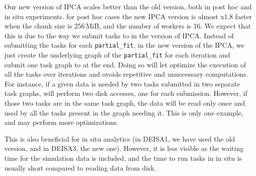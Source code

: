 Our new version of IPCA scales better than the old version, both in post hoc and in situ experiments. for post hoc cases the new IPCA version is almost x1.8 faster when the chunk size is 256\,MiB, and the number of workers is 16. We expect that this is due to the way we submit tasks to \dask in the version of IPCA.
Instead of submitting the tasks for each \texttt{partial\_fit}, in the new version of the IPCA, we just create the underlying graph of the \texttt{partial\_fit} for each iteration and submit one task graph to \dask at the end. Doing so will let \dask optimize the execution of all the tasks over iterations and ovoids repetitive and unnecessary computations. For instance, if a given data is needed by two tasks submitted in two separate task graphs, \dask will perform two disk accesses, one for each submission. However, if those two tasks are in the same task graph, the data will be read only once and used by all the tasks present in the graph needing it. This is only one example, and \dask may perform more optimizations.    

This is also beneficial for in situ analytics (in DEISA1, we have used the old version, and in DEISA3, the new one). However, it is less visible as the waiting time for the simulation data is included, and the time to run tasks in in situ is usually short compared to reading data from disk. 


